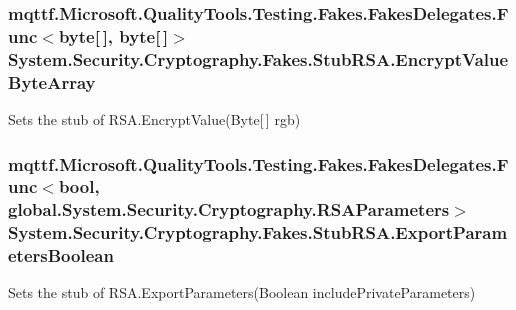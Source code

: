 \hypertarget{class_system_1_1_security_1_1_cryptography_1_1_fakes_1_1_stub_r_s_a_a5848e15ecafbb515408e92f8ef291734}{
\subsubsection[{Encrypt\-Value\-Byte\-Array}]{\setlength{\rightskip}{0pt plus 5cm}mqttf.\-Microsoft.\-Quality\-Tools.\-Testing.\-Fakes.\-Fakes\-Delegates.\-Func$<$byte\mbox{[}$\,$\mbox{]}, byte\mbox{[}$\,$\mbox{]}$>$ System.\-Security.\-Cryptography.\-Fakes.\-Stub\-R\-S\-A.\-Encrypt\-Value\-Byte\-Array}}\label{class_system_1_1_security_1_1_cryptography_1_1_fakes_1_1_stub_r_s_a_a5848e15ecafbb515408e92f8ef291734}


Sets the stub of R\-S\-A.\-Encrypt\-Value(\-Byte\mbox{[}$\,$\mbox{]} rgb)

\hypertarget{class_system_1_1_security_1_1_cryptography_1_1_fakes_1_1_stub_r_s_a_a8f20c26541b40eb5fdf15a4a80b1468a}{
\subsubsection[{Export\-Parameters\-Boolean}]{\setlength{\rightskip}{0pt plus 5cm}mqttf.\-Microsoft.\-Quality\-Tools.\-Testing.\-Fakes.\-Fakes\-Delegates.\-Func$<$bool, global.\-System.\-Security.\-Cryptography.\-R\-S\-A\-Parameters$>$ System.\-Security.\-Cryptography.\-Fakes.\-Stub\-R\-S\-A.\-Export\-Parameters\-Boolean}}\label{class_system_1_1_security_1_1_cryptography_1_1_fakes_1_1_stub_r_s_a_a8f20c26541b40eb5fdf15a4a80b1468a}


Sets the stub of R\-S\-A.\-Export\-Parameters(\-Boolean include\-Private\-Parameters)

